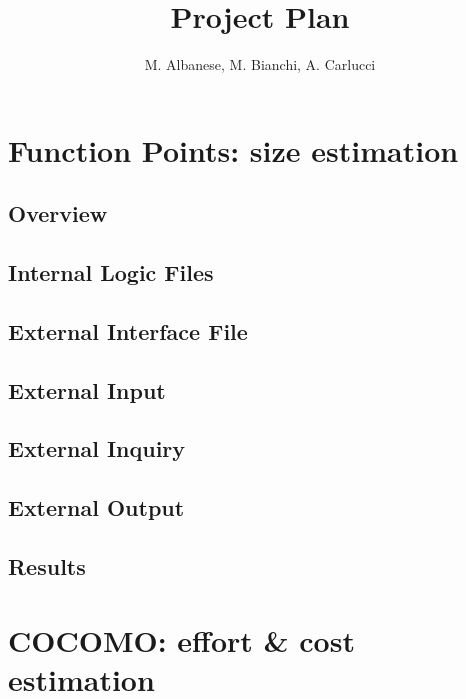 \documentclass[a4paper, 12pt]{article}
\begin{document}
\title{Project Plan}

\author{M. Albanese, M. Bianchi, A. Carlucci}

\maketitle
\newpage{}
\tableofcontents{}

\newpage{}

\section{Function Points: size estimation}
\subsection{Overview} %
\label{sub:fp_overview}

\subsection{Internal Logic Files} %
\label{sub:ilf}

\subsection{External Interface File} %
\label{sub:elf}

\subsection{External Input} %
\label{sub:ei}

\subsection{External Inquiry} %
\label{sub:eiq}

\subsection{External Output} %
\label{sub:eo}

\subsection{Results} %
\label{sub:results}

\newpage
\section{COCOMO: effort \& cost estimation}
\end{document}
